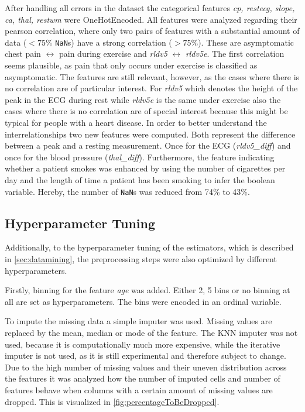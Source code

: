 After handling all errors in the dataset the categorical features \textit{cp, restecg, slope, ca, thal, restwm} were OneHotEncoded. All features were analyzed regarding their pearson correlation, where only two pairs of features with a substantial amount of data ($<75\%$ \texttt{NaN}s) have a strong correlation ($>75\%$).  
These are asymptomatic chest pain $\leftrightarrow$ pain during exercise and \textit{rldv5} $\leftrightarrow$ \textit{rldv5e}. The first correlation seems plausible, as pain that only occurs under exercise is classified as asymptomatic. The features are still relevant, however, as the cases where there is no correlation are of particular interest. For \textit{rldv5} which denotes the height of the peak in the ECG during rest while \textit{rldv5e} is the same under exercise also the cases where there is no correlation are of special interest because this might be typical for people with a heart disease. In order to better understand the interrelationships two new features were computed. Both represent the difference between a peak and a resting measurement. Once for the ECG (\textit{rldv5\_diff}) and once for the blood pressure (\textit{thal\_diff}). 
Furthermore, the feature indicating whether a patient smokes was enhanced by using the number of cigarettes per day and the length of time a patient has been smoking to infer the boolean variable. Hereby, the number of \texttt{NaN}s was reduced from 74\% to 43\%. 

\subsection{Hyperparameter Tuning} \label{subsec:hyperparametertuning}
Additionally, to the hyperparameter tuning of the estimators, which is described in \cref{sec:datamining}, the preprocessing steps were also optimized  by different hyperparameters.


Firstly, binning for the feature \textit{age} was added. Either 2, 5 bins or no binning at all are set as hyperparameters. The bins were encoded in an ordinal variable.

To impute the missing data a simple imputer was used. Missing values are replaced by the mean, median or mode of the feature. The KNN imputer was not used, because it is computationally much more expensive, while the iterative imputer is not used, as it is still experimental and therefore subject to change. Due to the high number of missing values and their uneven distribution across the features it was analyzed how the number of imputed cells and number of features behave when columns with a certain amount of missing values are dropped. This is visualized in \cref{fig:percentageToBeDropped}.

